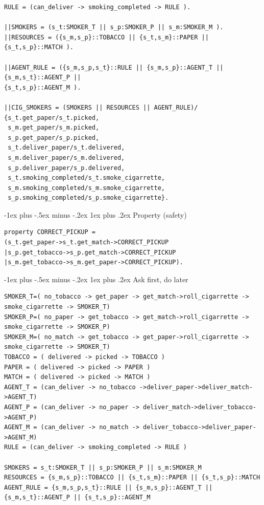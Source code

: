 \documentclass[letterpaper, 8pt]{extarticle}
\makeatletter
\renewcommand{\subsubsection}{\@startsection{subsubsection}{3}{0mm}%
                                {-1ex plus -.5ex minus -.2ex}%
                                {1ex plus .2ex}%
                                {\normalfont\tiny\bfseries}}
\makeatother
\begin{document}
\begin{multicols*}{5}
\begin{lstlisting}
RULE = (can_deliver -> smoking_completed -> RULE ).

||SMOKERS = (s_t:SMOKER_T || s_p:SMOKER_P || s_m:SMOKER_M ).
||RESOURCES = ({s_m,s_p}::TOBACCO || {s_t,s_m}::PAPER || {s_t,s_p}::MATCH ).

||AGENT_RULE = ({s_m,s_p,s_t}::RULE || {s_m,s_p}::AGENT_T || {s_m,s_t}::AGENT_P ||
{s_t,s_p}::AGENT_M ).

||CIG_SMOKERS = (SMOKERS || RESOURCES || AGENT_RULE)/
{s_t.get_paper/s_t.picked,
 s_m.get_paper/s_m.picked,
 s_p.get_paper/s_p.picked,
 s_t.deliver_paper/s_t.delivered,
 s_m.deliver_paper/s_m.delivered,
 s_p.deliver_paper/s_p.delivered,
 s_t.smoking_completed/s_t.smoke_cigarrette,
 s_m.smoking_completed/s_m.smoke_cigarrette,
 s_p.smoking_completed/s_p.smoke_cigarrette}.
\end{lstlisting}

  \subsubsection{Property (safety)}
  \begin{lstlisting}
property CORRECT_PICKUP =
(s_t.get_paper->s_t.get_match->CORRECT_PICKUP
|s_p.get_tobacco->s_p.get_match->CORRECT_PICKUP
|s_m.get_tobacco->s_m.get_paper->CORRECT_PICKUP).
\end{lstlisting}

  \subsubsection{Ask first, do later}
  \begin{lstlisting}
SMOKER_T=( no_tobacco -> get_paper -> get_match->roll_cigarrette ->
smoke_cigarrette -> SMOKER_T)
SMOKER_P=( no_paper -> get_tobacco -> get_match->roll_cigarrette ->
smoke_cigarrette -> SMOKER_P)
SMOKER_M=( no_match -> get_tobacco -> get_paper->roll_cigarrette ->
smoke_cigarrette -> SMOKER_T)
TOBACCO = ( delivered -> picked -> TOBACCO )
PAPER = ( delivered -> picked -> PAPER )
MATCH = ( delivered -> picked -> MATCH )
AGENT_T = (can_deliver -> no_tobacco ->deliver_paper->deliver_match->AGENT_T)
AGENT_P = (can_deliver -> no_paper -> deliver_match->deliver_tobacco->AGENT_P)
AGENT_M = (can_deliver -> no_match -> deliver_tobacco->deliver_paper->AGENT_M)
RULE = (can_deliver -> smoking_completed -> RULE )

SMOKERS = s_t:SMOKER_T || s_p:SMOKER_P || s_m:SMOKER_M
RESOURCES = {s_m,s_p}::TOBACCO || {s_t,s_m}::PAPER || {s_t,s_p}::MATCH
AGENT_RULE = {s_m,s_p,s_t}::RULE || {s_m,s_p}::AGENT_T || {s_m,s_t}::AGENT_P || {s_t,s_p}::AGENT_M


\end{lstlisting}
\end{multicols*}
\end{document}
